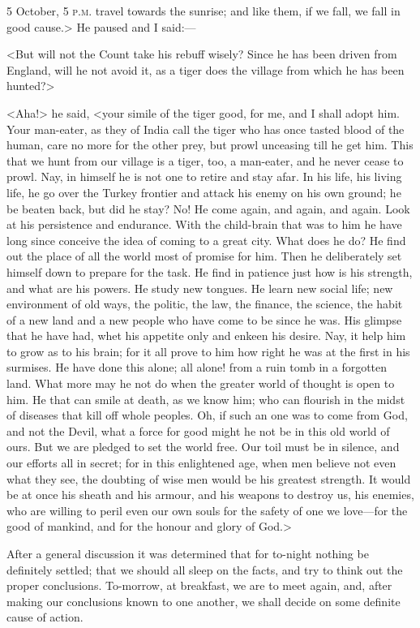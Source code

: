 \begin{diary}{5 October, 5 \textsc{p.m.}}
travel towards the sunrise; and like them, if we fall, we fall in good cause.> He paused and I said:—

<But will not the Count take his rebuff wisely? Since he has been driven from England, will he not avoid it, as a tiger does the village from which he has been hunted?>

<Aha!> he said, <your simile of the tiger good, for me, and I shall adopt him. Your man-eater, as they of India call the tiger who has once tasted blood of the human, care no more for the other prey, but prowl unceasing till he get him. This that we hunt from our village is a tiger, too, a man-eater, and he never cease to prowl. Nay, in himself he is not one to retire and stay afar. In his life, his living life, he go over the Turkey frontier and attack his enemy on his own ground; he be beaten back, but did he stay? No! He come again, and again, and again. Look at his persistence and endurance. With the child-brain that was to him he have long since conceive the idea of coming to a great city. What does he do? He find out the place of all the world most of promise for him. Then he deliberately set himself down to prepare for the task. He find in patience just how is his strength, and what are his powers. He study new tongues. He learn new social life; new environment of old ways, the politic, the law, the finance, the science, the habit of a new land and a new people who have come to be since he was. His glimpse that he have had, whet his appetite only and enkeen his desire. Nay, it help him to grow as to his brain; for it all prove to him how right he was at the first in his surmises. He have done this alone; all alone! from a ruin tomb in a forgotten land. What more may he not do when the greater world of thought is open to him. He that can smile at death, as we know him; who can flourish in the midst of diseases that kill off whole peoples. Oh, if such an one was to come from God, and not the Devil, what a force for good might he not be in this old world of ours. But we are pledged to set the world free. Our toil must be in silence, and our efforts all in secret; for in this enlightened age, when men believe not even what they see, the doubting of wise men would be his greatest strength. It would be at once his sheath and his armour, and his weapons to destroy us, his enemies, who are willing to peril even our own souls for the safety of one we love—for the good of mankind, and for the honour and glory of God.>

After a general discussion it was determined that for to-night nothing be definitely settled; that we should all sleep on the facts, and try to think out the proper conclusions. To-morrow, at breakfast, we are to meet again, and, after making our conclusions known to one another, we shall decide on some definite cause of action.


\end{diary}
